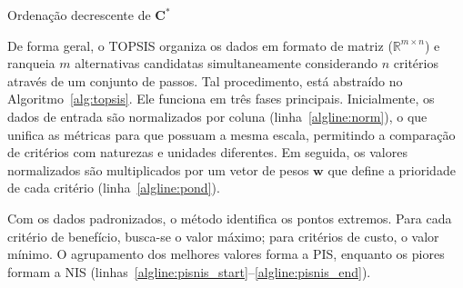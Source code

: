 \begin{algorithm}[htb]
\LinesNumbered
\caption{Processo de Avaliação Multi-critério TOPSIS}
\label{alg:topsis}
\BlankLine
{}
\BlankLine
{}
\Return Ordenação decrescente de $\mathbf{C}^*$\label{algline:rank}\;
\end{algorithm}

De forma geral, o \gls{TOPSIS} organiza os dados em formato de matriz ($\mathbb{R}^{m \times n}$) e ranqueia $m$ alternativas candidatas simultaneamente considerando $n$ critérios através de um conjunto de passos. Tal procedimento, está abstraído no Algoritmo~\ref{alg:topsis}.
Ele funciona em três fases principais. Inicialmente, os dados de entrada são normalizados por coluna (linha~\ref{algline:norm}), o que unifica as métricas para que possuam a mesma escala, permitindo a comparação de critérios com naturezas e unidades diferentes. Em seguida, os valores normalizados são multiplicados por um vetor de pesos $\mathbf{w}$ que define a prioridade de cada critério (linha~\ref{algline:pond}).

Com os dados padronizados, o método identifica os pontos extremos. Para cada critério de benefício, busca-se o valor máximo; para critérios de custo, o valor mínimo. O agrupamento dos melhores valores forma a PIS, enquanto os piores formam a NIS (linhas~\ref{algline:pisnis_start}--\ref{algline:pisnis_end}).

